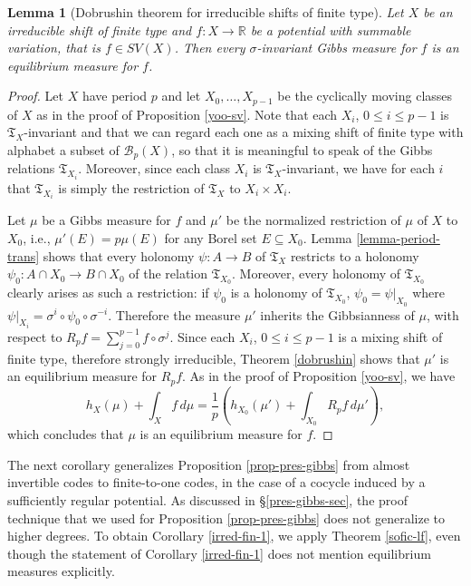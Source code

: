 \documentclass{amsproc}
\numberwithin{theorem}{section}
\newtheorem{lemma}[theorem]{Lemma}
\theoremstyle{remark}
\theoremstyle{definition}
\newcommand{\cB}{\mathcal{B}}
\newcommand{\fT}{\mathfrak{T}}
\newcommand{\R}{\mathbb{R}}
\theoremstyle{plain}
\begin{document}
\begin{lemma}[Dobrushin theorem for irreducible shifts of finite type]\label{dobrushin-irred-sft}
Let $X$ be an irreducible shift of finite type and $f\colon X \to \R$  be a potential with summable variation, that is $f \in SV(X)$. Then every $\sigma$-invariant Gibbs measure for $f$ is an equilibrium measure for $f$.
\end{lemma}

\begin{proof}
Let $X$ have period $p$ and let $X_0, \dots, X_{p-1}$ be the cyclically moving classes of $X$ as in the proof of Proposition \ref{yoo-sv}. Note that each $X_i$, $0 \leq i \leq p-1$ is $\fT_X$-invariant and that we can regard each one as a mixing shift of finite type with alphabet a subset of $\cB_p(X)$, so that it is meaningful to speak of the Gibbs relations $\fT_{X_i}$. Moreover, since each class $X_i$ is $\fT_{X}$-invariant, we have for each $i$ that $\fT_{X_i}$ is simply the restriction of $\fT_X$ to $X_i \times X_i$.

Let $\mu$ be a Gibbs measure for $f$ and  $\mu'$ be the normalized restriction of $\mu$ of $X$ to $X_0$, i.e., $\mu'(E) = p \mu(E)$ for any Borel set $E \subseteq X_0$. Lemma \ref{lemma-period-trans} shows that every holonomy $\psi: A \to B$ of $\fT_X$  restricts to a holonomy $\psi_0 : A \cap X_0 \to B \cap X_0$ of the relation $\fT_{X_0}$. Moreover, every holonomy of $\fT_{X_0}$ clearly arises as such a restriction: if $\psi_0$ is a holonomy of $\fT_{X_0}$, $\psi_0 = \psi|_{X_0}$ where $\psi|_{X_i} = \sigma^i \circ \psi_0 \circ \sigma^{-i}$. Therefore the measure $\mu'$ inherits the Gibbsianness of $\mu$, with respect to $R_p f =  \sum_{j=0}^{p-1} f \circ \sigma^j$. Since each $X_i$, $0 \leq i \leq p-1$ is a mixing shift of finite type, therefore strongly irreducible, Theorem \ref{dobrushin} shows that $\mu'$ is an equilibrium measure for $R_p f$. As in the proof of Proposition \ref{yoo-sv}, we have 
\[
h_X(\mu) + \int_X f \, d\mu = \frac{1}{p} \left( h_{X_0}(\mu') + \int_{X_0} R_p f \, d\mu'         \right),
\]
which concludes that $\mu$ is an equilibrium measure for $f$.

\end{proof}

The next corollary generalizes Proposition \ref{prop-pres-gibbs} from almost invertible codes to finite-to-one codes, in the case of a cocycle induced by a sufficiently regular potential. As discussed in \S \ref{pres-gibbs-sec}, the proof technique that we used for Proposition \ref{prop-pres-gibbs} does not generalize to higher degrees. To obtain Corollary \ref{irred-fin-1}, we apply Theorem \ref{sofic-lf}, even though the statement of Corollary \ref{irred-fin-1} does not mention equilibrium measures explicitly.
\end{document}
